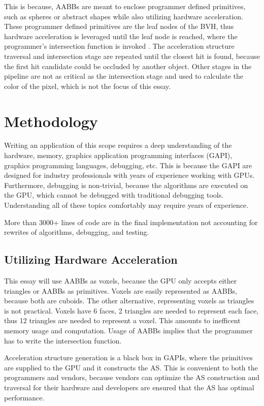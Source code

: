 \documentclass[12pt]{article}
\begin{document}
This is because, AABBs are meant to enclose programmer defined primitives, such as spheres or abstract shapes while also utilizing hardware acceleration.
These programmer defined primitives are the leaf nodes of the BVH, thus hardware acceleration is leveraged until the leaf node is reached, where the programmer's intersection function is invoked
\parencite{NVIDIA:BVH-Patent}.
The acceleration structure traversal and intersection stage are repeated until the closest hit is found, because the first hit candidate could be occluded by another object.
Other stages in the pipeline are not as critical as the intersection stage and used to calculate the color of the pixel, which is not the focus of this essay.

\parencite{NVIDIA:RTGems2}

\section{Methodology}

Writing an application of this scope requires a deep understanding of the hardware, memory, graphics application programming interfaces (GAPI), graphics programming languages, debugging, etc.
This is because the GAPI are designed for industry professionals with years of experience working with GPUs.
Furthermore, debugging is non-trivial, because the algorithms are executed on the GPU, which cannot be debugged with traditional debugging tools.
Understanding all of these topics comfortably may require years of experience.

More than 3000+ lines of code are in the final implementation not accounting for rewrites of algorithms, debugging, and testing.

\subsection{Utilizing Hardware Acceleration}

This essay will use AABBs as voxels, because the GPU only accepts either triangles or AABBs as primitives.
Voxels are easily represented as AABBs, because both are cuboids.
The other alternative, representing voxels as triangles is not practical. Voxels have 6 faces, 2 triangles
are needed to represent each face, thus 12 triangles are needed to represent a voxel. This amounts to
inefficent memory usage and computation. Usage of AABBs implies that the programmer has to write the intersection function.

Acceleration structure generation is a black box in GAPIs, where
the primitives are supplied to the GPU and it constructs the AS. This is convenient to both the programmers and vendors, because
vendors can optimize the AS construction and traversal for their hardware and developers are ensured that the AS has optimal performance.
\end{document}
